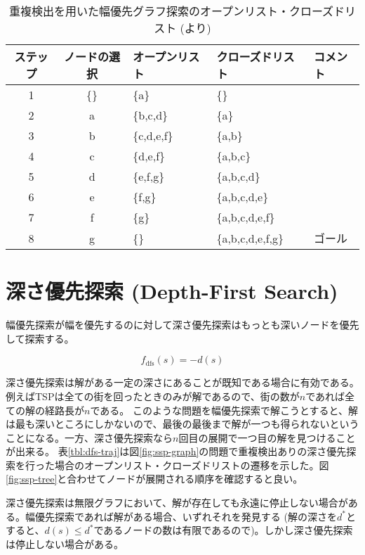 \begin{table}[tbh]
\centering
\caption{重複検出を用いた幅優先グラフ探索のオープンリスト・クローズドリスト (\cite{edelkamp:2010:hst:1875144}より)}
\begin{tabular}{c|c|l|l|l}
  \toprule
	ステップ & ノードの選択 & オープンリスト & クローズドリスト & コメント \\ \midrule
	1 	  & \{\}       & \{a\}      & \{\} \\
	2     & a        & \{b,c,d\}  & \{a\} \\
	3     & b        & \{c,d,e,f\} & \{a,b\} \\
	4     & c        & \{d,e,f\}   & \{a,b,c\} \\
	5     & d        & \{e,f,g\}   & \{a,b,c,d\} \\
	6     & e        & \{f,g\}     & \{a,b,c,d,e\} \\
	7     & f        & \{g\}       & \{a,b,c,d,e,f\} \\
	8     & g        & \{\}        & \{a,b,c,d,e,f,g\} & ゴール \\
        \bottomrule
\end{tabular}
\label{tbl:brfs-traj}
\end{table}

\section{深さ優先探索 (Depth-First Search)}
\label{sec:depth-first-search}

幅優先探索が幅を優先するのに対して深さ優先探索はもっとも深いノードを優先して探索する。

\begin{equation}
  f_{\text{dfs}}(s) = -d(s)
\label{alg:dfs-open}
\end{equation}

深さ優先探索は解がある一定の深さにあることが既知である場合に有効である。
例えばTSPは全ての街を回ったときのみが解であるので、街の数が$n$であれば全ての解の経路長が$n$である。
このような問題を幅優先探索で解こうとすると、解は最も深いところにしかないので、最後の最後まで解が一つも得られないということになる。一方、深さ優先探索なら$n$回目の展開で一つ目の解を見つけることが出来る。
表\ref{tbl:dfs-traj}は図\ref{fig:ssp-graph}の問題で重複検出ありの深さ優先探索を行った場合のオープンリスト・クローズドリストの遷移を示した。図\ref{fig:ssp-tree}と合わせてノードが展開される順序を確認すると良い。

深さ優先探索は無限グラフにおいて、解が存在しても永遠に停止しない場合がある。幅優先探索であれば解がある場合、いずれそれを発見する (解の深さを$d^*$とすると、$d(s) \leq d^*$であるノードの数は有限であるので)。しかし深さ優先探索は停止しない場合がある。


